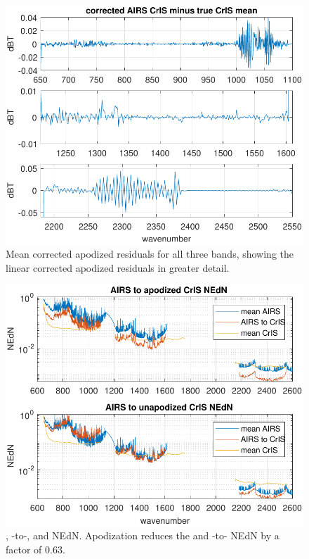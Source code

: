 \documentclass[journal]{IEEEtran}
\begin{document}
\begin{figure} %
  \centering
  \includegraphics[width=\linewidth]{figures/ap_decon_corr.pdf}
  \caption{Mean corrected apodized residuals for all three bands,
    showing the linear corrected apodized residuals in greater
    detail.}
  \label{statAll1}
\end{figure}


\begin{figure} %
  \centering
  \includegraphics[width=\linewidth]{figures/a2cris_nedn.pdf}
  \caption{{\airs}, {\airs}-to-{\cris}, and {\cris} NEdN.
    Apodization reduces the {\cris} and {\airs}-to-{\cris} NEdN by a
    factor of $0.63$.}
  \label{nedn}
\end{figure}
\end{document}
